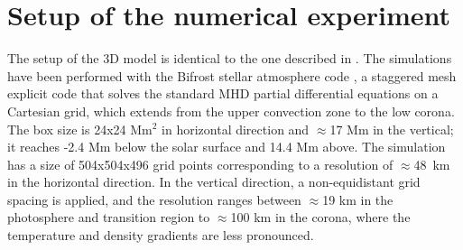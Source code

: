 \documentclass{aa}
\begin{document}


\section{Setup of the numerical experiment}\label{sim_section}


The setup of the 3D model is identical to the one described in \cite{zacharias+al:2018}. The simulations have been performed with the Bifrost stellar atmosphere code \citep{gudiksen+al:2011}, a staggered mesh explicit code that solves the standard MHD partial differential equations on a Cartesian grid, which extends from the upper convection zone to the low corona. The box size is 24x24 Mm$^2$ in horizontal direction and $\approx$17 Mm in the vertical; it reaches -2.4 Mm below the solar surface and 14.4 Mm above. The simulation has a size of 504x504x496 grid points corresponding to a resolution of $\approx$48~km in the horizontal direction. In the vertical direction, a non-equidistant grid spacing is applied, and the resolution ranges between $\approx$19 km in the photosphere and transition region to $\approx$100 km in the corona, where the temperature and density gradients are less pronounced. 
\end{document}

